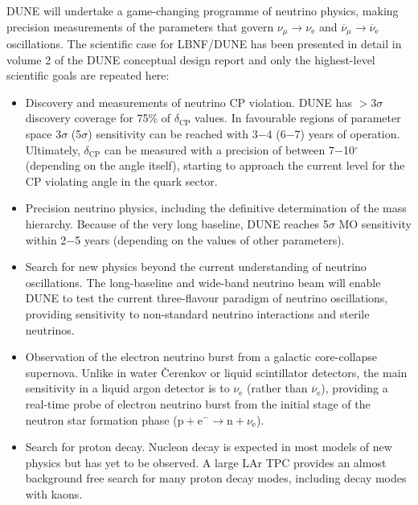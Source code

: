 DUNE will undertake a game-changing programme of neutrino physics, making precision measurements of the parameters that govern $\nu_{\mu} \rightarrow \nu_\text{e}$ and $\overline{\nu}_{\mu} \rightarrow \overline{\nu}_\text{e}$ oscillations. The scientific case for LBNF/DUNE has been presented in detail in volume 2 of the DUNE conceptual design report\cite{2015arXiv151206148D} and only the highest-level scientific goals are repeated here:
\begin{itemize}
\item 
Discovery and measurements of neutrino CP violation. DUNE has $>$3$\sigma$ discovery coverage for 75\% of $\delta_\text{CP}$ values. In favourable regions of parameter space 3$\sigma$ (5$\sigma$) sensitivity can be reached with 3$-$4 (6$-$7) years of operation. Ultimately, $\delta_\text{CP}$ can be measured with a precision of between 7$-$10$^\circ$ (depending on the angle itself), starting to approach the current level for the CP violating angle in the quark sector.   
\item  
Precision neutrino physics, including the definitive determination of the mass hierarchy. Because of the very long baseline, DUNE reaches 5$\sigma$ MO sensitivity within 2$-$5 years 
(depending on the values of other parameters).	
\item
Search for new physics beyond the current understanding of neutrino oscillations. The long-baseline and wide-band neutrino beam will enable DUNE to test the current three-flavour paradigm of neutrino oscillations, providing sensitivity to non-standard neutrino interactions and sterile neutrinos. 
\item 
Observation of the electron neutrino burst from a galactic core-collapse supernova. Unlike in water \v{C}erenkov or liquid scintillator detectors, the main sensitivity in a liquid argon detector is to $\nu_\text{e}$ (rather than $\overline{\nu}_\text{e}$), providing a real-time probe of electron neutrino burst from the initial stage of the neutron star formation phase ($\text{p} + \text{e}^- \rightarrow \text{n} + \nu_\text{e}$). 
\item 
Search for proton decay. Nucleon decay is expected in most models of new physics but has yet to be observed. A large LAr TPC provides an almost background free search for many proton decay modes, including decay modes with kaons.
\end{itemize} 

